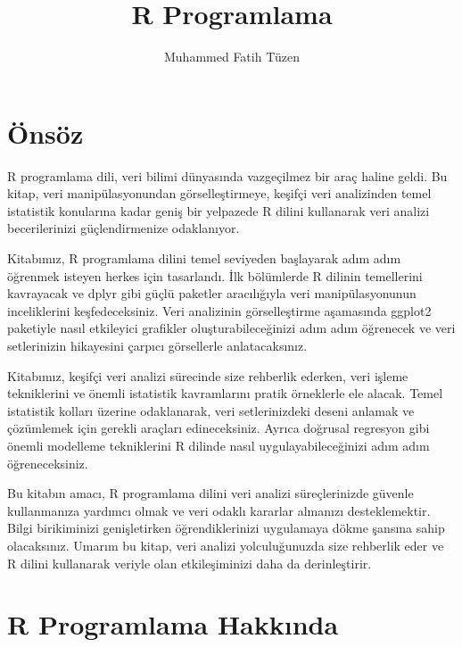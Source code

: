 \documentclass[
  letterpaper,
  DIV=11,
  numbers=noendperiod]{scrreprt}
\title{R Programlama}
\author{Muhammed Fatih Tüzen}
\date{}
\renewcommand*\contentsname{İçindekiler}
\newcommand\contentsname{İçindekiler}
\begin{document}
\maketitle

\renewcommand*\contentsname{İçindekiler}
{
\hypersetup{linkcolor=}
\setcounter{tocdepth}{2}
\tableofcontents
}


\chapter*{Önsöz}\label{uxf6nsuxf6z}


R programlama dili, veri bilimi dünyasında vazgeçilmez bir araç haline
geldi. Bu kitap, veri manipülasyonundan görselleştirmeye, keşifçi veri
analizinden temel istatistik konularına kadar geniş bir yelpazede R
dilini kullanarak veri analizi becerilerinizi güçlendirmenize
odaklanıyor.

Kitabımız, R programlama dilini temel seviyeden başlayarak adım adım
öğrenmek isteyen herkes için tasarlandı. İlk bölümlerde R dilinin
temellerini kavrayacak ve dplyr gibi güçlü paketler aracılığıyla veri
manipülasyonunun inceliklerini keşfedeceksiniz. Veri analizinin
görselleştirme aşamasında ggplot2 paketiyle nasıl etkileyici grafikler
oluşturabileceğinizi adım adım öğrenecek ve veri setlerinizin hikayesini
çarpıcı görsellerle anlatacaksınız.

Kitabımız, keşifçi veri analizi sürecinde size rehberlik ederken, veri
işleme tekniklerini ve önemli istatistik kavramlarını pratik örneklerle
ele alacak. Temel istatistik kolları üzerine odaklanarak, veri
setlerinizdeki deseni anlamak ve çözümlemek için gerekli araçları
edineceksiniz. Ayrıca doğrusal regresyon gibi önemli modelleme
tekniklerini R dilinde nasıl uygulayabileceğinizi adım adım
öğreneceksiniz.

Bu kitabın amacı, R programlama dilini veri analizi süreçlerinizde
güvenle kullanmanıza yardımcı olmak ve veri odaklı kararlar almanızı
desteklemektir. Bilgi birikiminizi genişletirken öğrendiklerinizi
uygulamaya dökme şansına sahip olacaksınız. Umarım bu kitap, veri
analizi yolculuğunuzda size rehberlik eder ve R dilini kullanarak
veriyle olan etkileşiminizi daha da derinleştirir.


\chapter*{R Programlama Hakkında}\label{sec-intro}
\end{document}

